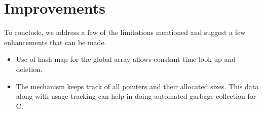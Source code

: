 \documentclass[a4paper, 12pt]{article}
\begin{document}
\section{Improvements}
To conclude, we address a few of the limitations mentioned and suggest a few enhancements that can be made.
\begin{itemize}
\item Use of hash map for the global array allows constant time look up and deletion.
\item The mechanism keeps track of all pointers and their allocated sizes.  This data along with usage tracking can help in doing automated garbage collection for C.
\end{itemize}
\end{document}
